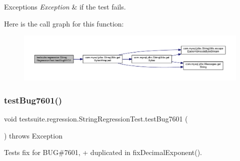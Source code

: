 \begin{DoxyExceptions}{Exceptions}
{\em Exception} & if the test fails. \\
\hline
\end{DoxyExceptions}
Here is the call graph for this function\+:
\nopagebreak
\begin{figure}[H]
\begin{center}
\leavevmode
\includegraphics[width=350pt]{classtestsuite_1_1regression_1_1_string_regression_test_a7e24a2a41964d76d3b5b82b5a064d820_cgraph}
\end{center}
\end{figure}
\mbox{\label{classtestsuite_1_1regression_1_1_string_regression_test_a7daa6aace5462393758a0ccdcb6dd4c9}} 
\subsubsection{\texorpdfstring{test\+Bug7601()}{testBug7601()}}
{\footnotesize\ttfamily void testsuite.\+regression.\+String\+Regression\+Test.\+test\+Bug7601 (\begin{DoxyParamCaption}{ }\end{DoxyParamCaption}) throws Exception}

Tests fix for B\+UG\#7601, \textquotesingle{}+\textquotesingle{} duplicated in fix\+Decimal\+Exponent().


